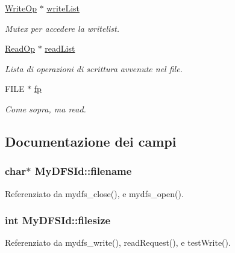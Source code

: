 \begin{DoxyCompactItemize}
\hyperlink{structWriteOp}{Write\+Op} $\ast$ \hyperlink{structMyDFSId_a0f7d2a9c60ddc649ee7e65b8b9295432}{write\+List}
\begin{DoxyCompactList}\small\item\em Mutex per accedere la writelist. \end{DoxyCompactList}\item 
\hyperlink{structReadOp}{Read\+Op} $\ast$ \hyperlink{structMyDFSId_a8a4360512d45c22b6d8e980967c7dd32}{read\+List}
\begin{DoxyCompactList}\small\item\em Lista di operazioni di scrittura avvenute nel file. \end{DoxyCompactList}\item 
F\+I\+L\+E $\ast$ \hyperlink{structMyDFSId_ae2badd91d3b506420a9e49554df8212d}{fp}
\begin{DoxyCompactList}\small\item\em Come sopra, ma read. \end{DoxyCompactList}\end{DoxyCompactItemize}


\subsection{Documentazione dei campi}
\hypertarget{structMyDFSId_ac0e1b8c96d859982c1a7d49f9e929e48}{
\subsubsection[{filename}]{\setlength{\rightskip}{0pt plus 5cm}char$\ast$ My\+D\+F\+S\+Id\+::filename}}\label{structMyDFSId_ac0e1b8c96d859982c1a7d49f9e929e48}


Referenziato da mydfs\+\_\+close(), e mydfs\+\_\+open().

\hypertarget{structMyDFSId_a2b7cf19c5ac22e03ae8abf7e688fee2a}{
\subsubsection[{filesize}]{\setlength{\rightskip}{0pt plus 5cm}int My\+D\+F\+S\+Id\+::filesize}}\label{structMyDFSId_a2b7cf19c5ac22e03ae8abf7e688fee2a}


Referenziato da mydfs\+\_\+write(), read\+Request(), e test\+Write().

